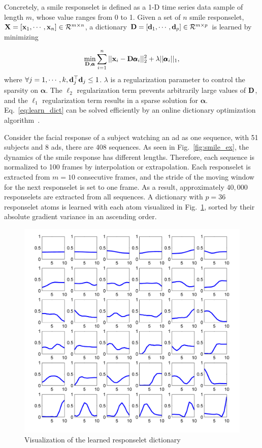 \documentclass[twoside,leqno,twocolumn]{article}
\begin{document}
Concretely, a smile responselet is defined as a 1-D time series data sample of length $m$, whose value ranges from 0 to 1. Given a set of $n$ smile responselet, ${\bf X}=[{\bf x}_1, \cdots, {\bf x}_n]\in \mathcal{R}^{m\times n}$, a dictionary ${\bf D}=[{\bf d}_1,\cdots,{\bf d}_p] \in \mathcal{R}^{m\times p}$ is learned by minimizing

\begin{align}
\label{eq:learn_dict}
\min_{{\bf D} , \pmb\alpha} \sum_{i=1}^n ||{\bf x}_i-{\bf D} \pmb\alpha_i||^2_2 +\lambda ||\pmb\alpha_i||_1,
\end{align}
where $\forall j=1,\cdots,k, {\bf d}^\top_j {\bf d}_j \leq 1$. $\lambda$ is a regularization parameter to control the sparsity on $\pmb\alpha$. The $\ell_2$ regularization term prevents arbitrarily large values of ${\bf D}$, and the $\ell_1$ regularization term results in a sparse solution for $\pmb\alpha$. Eq.~\eqref{eq:learn_dict} can be solved efficiently by an online dictionary optimization algorithm~\cite{spams}. 

Consider the facial response of a subject watching an ad as one sequence, with 51 subjects and 8 ads, there are 408 sequences. As seen in Fig.~\ref{fig:smile_ex}, the dynamics of the smile response has different lengths. Therefore, each sequence is normalized to 100 frames by interpolation or extrapolation. Each responselet is extracted from $m=10$ consecutive frames, and the stride of the moving window for the next responselet is set to one frame. As a result, approximately $40,000$ responselets are extracted from all sequences. A dictionary with $p=36$ responselet atoms is learned with each atom visualized in Fig.~\ref{fig:dict}, sorted by their absolute gradient variance in an ascending order. 

\begin{figure}[!t]
	\centering
		\includegraphics[width=\columnwidth]{fig/dict.png}
	\caption{Visualization of the learned responselet dictionary}
	\label{fig:dict}
\end{figure}
\end{document}
